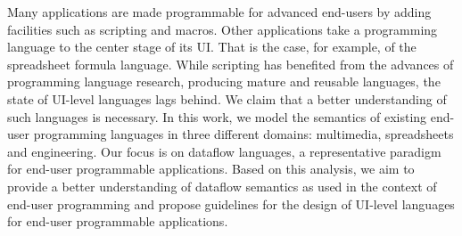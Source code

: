 
Many applications are made programmable for advanced end-users by
adding facilities such as scripting and macros. Other applications
take a programming language to the center stage of its UI. That is
the case, for example, of the spreadsheet formula language. While
scripting has benefited from the advances of programming language
research, producing mature and reusable languages, the state of UI-level
languages lags behind. We claim that a better understanding of such
languages is necessary. In this work, we model the semantics of existing
end-user programming languages in three different domains: multimedia,
spreadsheets and engineering. Our focus is on dataflow languages,
a representative paradigm for end-user programmable applications.
Based on this analysis, we aim to provide a better understanding of
dataflow semantics as used in the context of end-user programming
and propose guidelines for the design of UI-level languages for end-user
programmable applications. 

